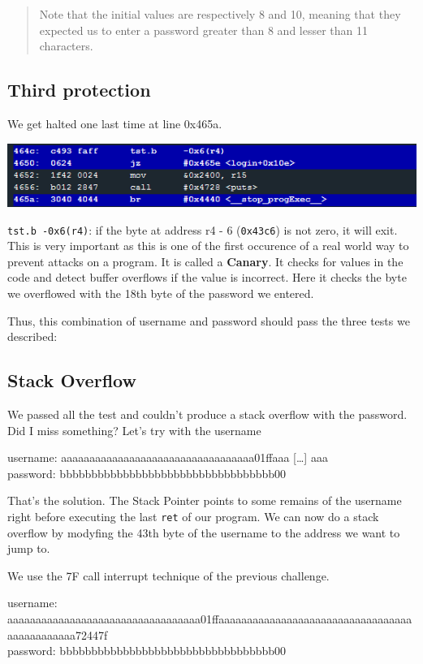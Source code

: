 \begin{quote}
Note that the initial values are respectively 8 and 10, meaning that
they expected us to enter a password greater than 8 and lesser than 11
characters.
\end{quote}

\subsection{Third protection}\label{third-protection}

We get halted one last time at line 0x465a.

\includegraphics{img/10_4.PNG}

\texttt{tst.b -0x6(r4)}: if the byte at address r4 - 6 (\texttt{0x43c6})
is not zero, it will exit. This is very important as this is one of the
first occurence of a real world way to prevent attacks on a program. It
is called a \textbf{Canary}. It checks for values in the code and detect
buffer overflows if the value is incorrect. Here it checks the byte we
overflowed with the 18th byte of the password we entered.

Thus, this combination of username and password should pass the three
tests we described:

\subsection{Stack Overflow}\label{stack-overflow}

We passed all the test and couldn't produce a stack overflow with the
password. Did I miss something? Let's try with the username

username: aaaaaaaaaaaaaaaaaaaaaaaaaaaaaaaaaa01ffaaa {[}\ldots{}{]}
aaa\\password: bbbbbbbbbbbbbbbbbbbbbbbbbbbbbbbbbb00

That's the solution. The Stack Pointer points to some remains of the
username right before executing the last \texttt{ret} of our program. We
can now do a stack overflow by modyfing the 43th byte of the username to
the address we want to jump to.

We use the 7F call interrupt technique of the previous challenge.

username:
aaaaaaaaaaaaaaaaaaaaaaaaaaaaaaaaaa01ffaaaaaaaaaaaaaaaaaaaaaaaaaaaaaaaaaaaaaaaaaaaaaa72447f\\password:
bbbbbbbbbbbbbbbbbbbbbbbbbbbbbbbbbb00

